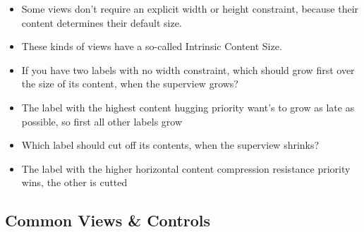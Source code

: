 \begin{breakbox}

\begin{itemize}
\tightlist
\item
  Some views don't require an explicit width or height constraint,
  because their content determines their default size.
\item
  These kinds of views have a so-called Intrinsic Content Size.
\end{itemize}
\end{breakbox}

\begin{breakbox}

\begin{itemize}
\tightlist
\item
  If you have two labels with no width constraint, which should grow
  first over the size of its content, when the superview grows?
\item
  The label with the highest content hugging priority want's to grow as
  late as possible, so first all other labels grow
\end{itemize}
\end{breakbox}

\begin{breakbox}
\begin{itemize}
\tightlist
\item
  Which label should cut off its contents, when the superview shrinks?
\item
  The label with the higher horizontal content compression resistance
  priority wins, the other is cutted
\end{itemize}
\end{breakbox}

\subsection{Common Views \& Controls}


